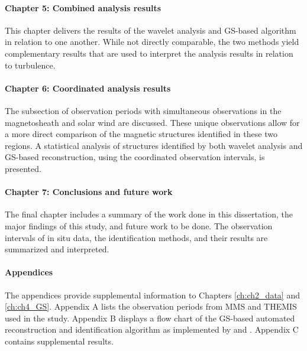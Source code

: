 \paragraph*{Chapter 5: Combined analysis results}
This chapter delivers the results of the wavelet analysis and GS-based algorithm in relation to one another. While not directly comparable, the two methods yield complementary results that are used to interpret the analysis results in relation to turbulence.

\paragraph*{Chapter 6: Coordinated analysis results}
The subsection of observation periods with simultaneous observations in the magnetosheath and solar wind are discussed. These unique observations allow for a more direct comparison of the magnetic structures identified in these two regions. A statistical analysis of structures identified by both wavelet analysis and GS-based reconstruction, using the coordinated observation intervals, is presented.

\paragraph*{Chapter 7: Conclusions and future work}
The final chapter includes a summary of the work done in this dissertation, the major findings of this study, and future work to be done. The observation intervals of in situ data, the identification methods, and their results are summarized and interpreted.

\paragraph*{Appendices}
The appendices provide supplemental information to Chapters \ref{ch:ch2_data} and \ref{ch:ch4_GS}. Appendix A lists the observation periods from MMS and THEMIS used in the study. Appendix B displays a flow chart of the GS-based automated reconstruction and identification algorithm as implemented by \cite{Hu:2018} and \cite{Zheng:2018}. Appendix C contains supplemental results.